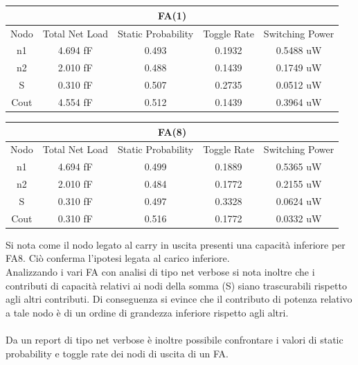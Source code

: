 \documentclass[11pt,  english, makeidx, a4paper, titlepage, oneside]{book}
\begin{document}
\\\\
\begin{center}
	\begin{tabular}{|c|c|c|c|c|}
	\multicolumn{5}{c}{FA(1) }\\
	\hline
	Nodo &  Total Net Load & Static Probability & Toggle Rate & Switching Power \\ 
	\hline
	n1 & 4.694 fF & 0.493 & 0.1932 & 0.5488 uW  \\
	\hline
	n2 & 2.010 fF & 0.488 & 0.1439 & 0.1749 uW  \\
	\hline
	S & 0.310 fF & 0.507 & 0.2735 & 0.0512 uW  \\
	\hline
	Cout & 4.554 fF & 0.512 &  0.1439 & 0.3964 uW  \\
	\hline
	\end{tabular}
\end{center}
\vspace{0.3cm}
\begin{center}
	\begin{tabular}{|c|c|c|c|c|}
	\multicolumn{5}{c}{FA(8) }\\
	\hline
	Nodo &  Total Net Load & Static Probability & Toggle Rate & Switching Power \\ 
	\hline
	n1 & 4.694 fF & 0.499 & 0.1889 & 0.5365 uW  \\
	\hline
	n2 & 2.010 fF & 0.484 & 0.1772 & 0.2155 uW  \\
	\hline
	S & 0.310 fF & 0.497 & 0.3328 & 0.0624 uW  \\
	\hline
	Cout & 0.310 fF & 0.516 &  0.1772 & 0.0332 uW  \\
	\hline
	\end{tabular}
\end{center}
\vspace{0.3cm}
Si nota come il nodo legato al carry in uscita presenti una capacità inferiore per FA8. Ciò conferma l'ipotesi legata al carico inferiore.
\\
Analizzando i vari FA con analisi di tipo net verbose si nota inoltre che i contributi di capacità relativi ai nodi della somma (S) siano trascurabili rispetto agli altri contributi.
Di conseguenza si evince che il contributo di potenza relativo a tale nodo è di un ordine di grandezza inferiore rispetto agli altri.
\\\\
Da un report di tipo net verbose è inoltre possibile confrontare i valori di static probability e toggle rate dei nodi di uscita di un FA.
\\
\end{document}
